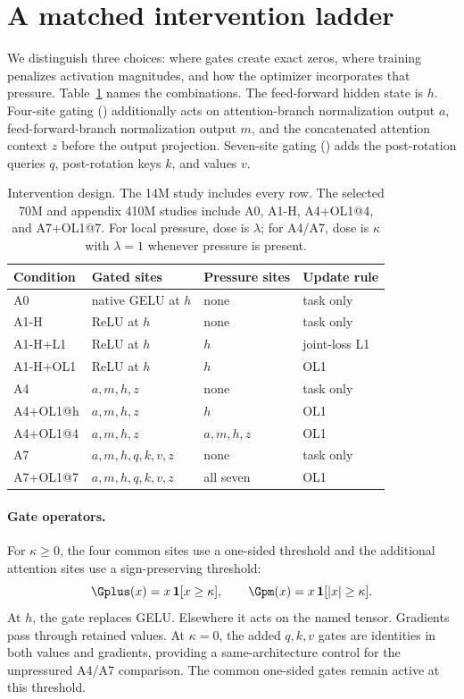 \section{A matched intervention ladder}
\label{sec:interventions}
We distinguish three choices: where gates create exact zeros, where
training penalizes activation magnitudes, and how the optimizer incorporates
that pressure. Table~\ref{tab:design} names the combinations.
The feed-forward hidden state is $h$. Four-site gating (\Afour) additionally
acts on attention-branch normalization output $a$, feed-forward-branch
normalization output $m$, and the concatenated attention context $z$ before
the output projection. Seven-site gating (\Aseven) adds the post-rotation
queries $q$, post-rotation keys $k$, and values $v$.

\begin{table}[t]
\centering
\caption{Intervention design. The 14M study includes every row. The selected
70M and appendix 410M studies include A0, A1-H, A4+OL1@4, and A7+OL1@7.
For local pressure, dose is $\lambda$; for A4/A7, dose is $\kappa$ with
$\lambda=1$ whenever pressure is present.}
\label{tab:design}
\small
\begin{tabular}{llll}
\toprule
Condition & Gated sites & Pressure sites & Update rule \\
\midrule
A0 & native GELU at $h$ & none & task only \\
A1-H & ReLU at $h$ & none & task only \\
A1-H+L1 & ReLU at $h$ & $h$ & joint-loss L1 \\
A1-H+OL1 & ReLU at $h$ & $h$ & OL1 \\
A4 & $a,m,h,z$ & none & task only \\
A4+OL1@h & $a,m,h,z$ & $h$ & OL1 \\
A4+OL1@4 & $a,m,h,z$ & $a,m,h,z$ & OL1 \\
A7 & $a,m,h,q,k,v,z$ & none & task only \\
A7+OL1@7 & $a,m,h,q,k,v,z$ & all seven & OL1 \\
\bottomrule
\end{tabular}
\end{table}

\paragraph{Gate operators.}
For $\kappa\geq0$, the four common sites use a one-sided threshold and the
additional attention sites use a sign-preserving threshold:
\begin{equation}
  \Gplus(x)=x\,\mathbf{1}[x\geq\kappa],
  \qquad
  \Gpm(x)=x\,\mathbf{1}[|x|\geq\kappa].
  \label{eq:gates}
\end{equation}
At $h$, the gate replaces GELU. Elsewhere it acts on the named tensor.
Gradients pass through retained values. At $\kappa=0$, the added $q,k,v$
gates are identities in both values and gradients, providing a
same-architecture control for the unpressured A4/A7 comparison.
The common one-sided gates remain active at this threshold.

